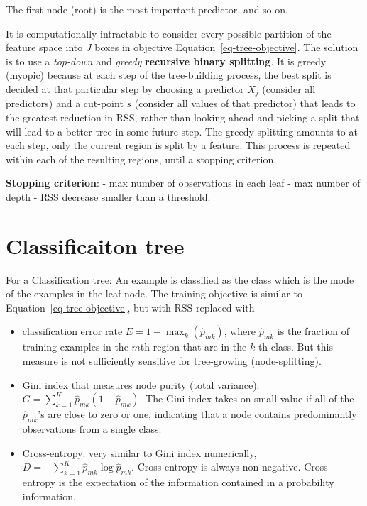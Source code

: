 \documentclass[
  letterpaper,
  DIV=11,
  numbers=noendperiod]{scrreprt}
\providecommand{\tightlist}{%
  \setlength{\itemsep}{0pt}\setlength{\parskip}{0pt}}\usepackage{longtable,booktabs,array}
\begin{document}
The first node (root) is the most important predictor, and so on.

It is computationally intractable to consider every possible partition
of the feature space into \(J\) boxes in objective
Equation~\ref{eq-tree-objective}. The solution is to use a
\emph{top-down} and \emph{greedy} \textbf{recursive binary splitting}.
It is greedy (myopic) because at each step of the tree-building process,
the best split is decided at that particular step by choosing a
predictor \(X_j\) (consider all predictors) and a cut-point \(s\)
(consider all values of that predictor) that leads to the greatest
reduction in RSS, rather than looking ahead and picking a split that
will lead to a better tree in some future step. The greedy splitting
amounts to at each step, only the current region is split by a feature.
This process is repeated within each of the resulting regions, until a
stopping criterion.

\textbf{Stopping criterion}: - max number of observations in each leaf -
max number of depth - RSS decrease smaller than a threshold.

\section{Classificaiton tree}\label{classificaiton-tree}

For a Classification tree: An example is classified as the class which
is the mode of the examples in the leaf node. The training objective is
similar to Equation~\ref{eq-tree-objective}, but with RSS replaced with

\begin{itemize}
\tightlist
\item
  classification error rate \(E=1- \max_k(\hat{p}_{mk})\), where
  \(\hat{p}_{mk}\) is the fraction of training examples in the \(m\)th
  region that are in the \(k\)-th class. But this measure is not
  sufficiently sensitive for tree-growing (node-splitting).
\item
  Gini index that measures node purity (total variance):
  \(G=\sum_{k=1}^K\hat{p}_{mk}(1-\hat{p}_{mk})\). The Gini index takes
  on small value if all of the \(\hat{p}_{mk}\)'s are close to zero or
  one, indicating that a node contains predominantly observations from a
  single class.
\item
  Cross-entropy: very similar to Gini index numerically,
  \(D=-\sum_{k=1}^K\hat{p}_{mk}\log \hat{p}_{mk}\). Cross-entropy is
  always non-negative. Cross entropy is the expectation of the
  information contained in a probability information.
\end{itemize}
\end{document}
